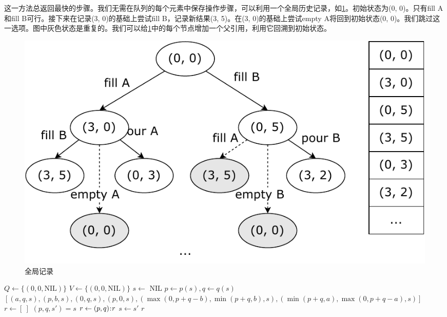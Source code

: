 \documentclass[b5paper]{ctexart}
\begin{document}
这一方法总返回最快的步骤。我们无需在队列的每个元素中保存操作步骤，可以利用一个全局历史记录，如\cref{fig:water-jugs}。初始状态为(0, 0)。只有fill A和fill B可行。接下来在记录(3, 0)的基础上尝试fill B，记录新结果(3, 5)。在(3, 0)的基础上尝试empty A将回到初始状态(0, 0)。我们跳过这一选项。图中灰色状态是重复的。我们可以给\cref{fig:water-jugs}中的每个节点增加一个父引用，利用它回溯到初始状态。

\begin{figure}[htbp]
  \centering
  \includegraphics[scale=0.5]{img/water-jugs}
  \caption{全局记录}
  \label{fig:water-jugs}
\end{figure}

\begin{algorithmic}[1]
  \State $Q \gets \{(0, 0, \text{NIL})\}$
  \State $V \gets \{(0, 0, \text{NIL})\}$  
    \State $s \gets$ 
      \State \Return {}
    \Else
          \State {}
          \State {}
        \EndIf
      \EndFor
    \EndIf
  \EndWhile
  \State \Return NIL
\EndFunction
\Statex
{}
  \State $p \gets p(s), q \gets q(s)$
  \State \Return $[(a, q, s), (p, b, s), (0, q, s), (p, 0, s), (\max(0, p + q - b), \min(p + q, b), s), (\min(p + q, a), \max(0, p + q - a), s)]$
\EndFunction
\Statex
{}
  \State $r \gets [\ ]$
    \State $(p, q, s') = s$
    \State $r \gets (p, q) \mathbin{\!:\!} r$
    \State $s \gets s'$
  \EndWhile
  \State \Return $r$
\EndFunction
\end{algorithmic}

\begin{Exercise}
\end{Exercise}
\end{document}
